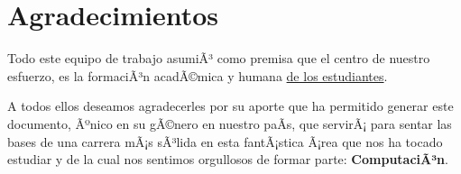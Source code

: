 \chapter*{Agradecimientos}\label{chap:cs-ack}
%




Todo este equipo de trabajo asumiÃ³ como premisa que el centro de nuestro esfuerzo, 
es la formaciÃ³n acadÃ©mica y humana \underline{de los estudiantes}.

A todos ellos deseamos agradecerles por su aporte que ha permitido generar 
este documento, Ãºnico en su gÃ©nero en nuestro paÃ­s, que servirÃ¡ para sentar las 
bases de una carrera mÃ¡s sÃ³lida en esta fantÃ¡stica Ã¡rea que nos ha tocado estudiar y 
de la cual nos sentimos orgullosos de formar parte: \textbf{ComputaciÃ³n}.
